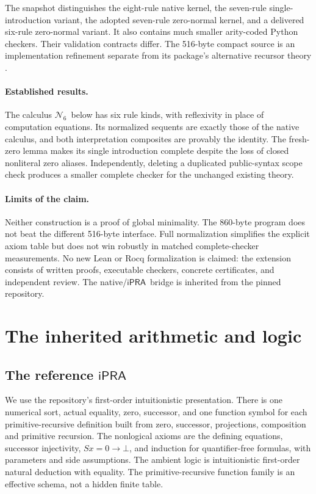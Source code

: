 \documentclass[11pt]{article}
\theoremstyle{definition}
\newcommand{\ipra}{\ensuremath{\mathsf{iPRA}}}
\newcommand{\Six}{\ensuremath{\mathcal N_6}}
\begin{document}
The snapshot distinguishes the eight-rule native kernel, the seven-rule
single-introduction variant, the adopted seven-rule zero-normal kernel,
and a delivered six-rule zero-normal variant. It also contains much
smaller arity-coded Python checkers. Their validation contracts differ.
The 516-byte compact source is an implementation refinement separate
from its package's alternative recursor theory \cite{canonical}.

\paragraph{Established results.}
The calculus \Six\ below has six rule kinds, with reflexivity in place
of computation equations. Its normalized sequents are exactly those of
the native calculus, and both interpretation composites are provably
the identity. The fresh-zero lemma makes its single introduction
complete despite the loss of closed nonliteral zero aliases.
Independently, deleting a duplicated public-syntax scope check produces
a smaller complete checker for the unchanged existing theory.

\paragraph{Limits of the claim.}
Neither construction is a proof of global minimality. The 860-byte
program does not beat the different 516-byte interface. Full
normalization simplifies the explicit axiom table but does not win
robustly in matched complete-checker measurements. No new Lean or Rocq
formalization is claimed: the extension consists of written proofs,
executable checkers, concrete certificates, and independent review.
The native/\ipra\ bridge is inherited from the pinned repository.

\section{The inherited arithmetic and logic}
\label{sec:inherited}

\subsection{The reference \ipra}

We use the repository's first-order intuitionistic presentation. There
is one numerical sort, actual equality, zero, successor, and one
function symbol for each primitive-recursive definition built from
zero, successor, projections, composition and primitive recursion.
The nonlogical axioms are the defining equations, successor
injectivity, $Sx=0\to\bot$, and induction for quantifier-free formulas,
with parameters and side assumptions. The ambient logic is
intuitionistic first-order natural deduction with equality. The
primitive-recursive function family is an effective schema, not a
hidden finite table.
\end{document}

